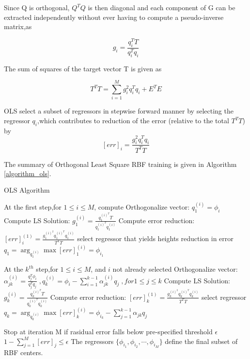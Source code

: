 \documentclass[12pt,a4paper,oneside]{article}
\numberwithin{equation}{section}
\numberwithin{algorithm}{section}
\begin{document}
	Since Q is orthogonal, $Q^TQ$ is then diagonal and each component of G can be extracted independently without ever having to compute a pseudo-inverse matrix,as
	
	\begin{equation}\label{ols_pseudo_inverse}
	g_i=\frac{q^T_iT}{q^T_iq_i}
	\end{equation}
	
	The sum of squares of the target vector T is given as
	
	\begin{equation}
	T^TT=\sum\limits_{i=1}^{M}g^2_iq^T_iq_i+E^TE
	\end{equation}
	
	OLS select a subset of regressors in stepwise forward manner by selecting the regressor $q_i$,which contributes to reduction of the error (relative to the total $T^TT$) by
	\begin{equation}\label{ols_error}
	[err]_i=\frac{g^2_iq^T_iq_i}{T^TT}
	\end{equation}
	
	The summary of Orthogonal Least Square RBF training \cite{Chen1991} is given in Algorithm \ref{algorithm_ols}.
	
	\begin{algorithm}
	\caption{OLS Algorithm}
	\label{algorithm_ols}
	\begin{algorithmic}[1]
	\STATE At the first step,for $1\le i\le M$, compute
	\STATE \qquad\qquad Orthogonalize vector: $q^{(i)}_1=\phi_i$
	\STATE \qquad\qquad Compute LS Solution:	$g^{(i)}_1=\frac{q^{{(i)}^T}_1T}{q^{{(i)}^T}_1q^{(i)}_1}$
	\STATE \qquad\qquad Compute error reduction: $[err]^{(1)}_i=\frac{g^{{(i)}^2}_1q^{{(i)}^T}_1q^{(i)}_1}{T^TT}$
	\STATE \quad select regressor that yields heights reduction in error $q_1=\arg_{q^{(i)}_1}\max[err]^{(i)}_1=\phi_{i_1}$
	
	
	\STATE At the $k^{th}$ step,for $1\le i\le M$, and $i$ not already selected
	\STATE \qquad\qquad Orthogonalize vector: $\alpha^{(i)}_{jk}=\frac{q^T_j\phi_i}{q^T_jq_j} \;, q^{(i)}_k=\phi_i-\sum\limits_{i=1}^{k-1}\alpha^{(i)}_{jk}q_j \;, for 1\le j \le k $
	\STATE \qquad\qquad Compute LS Solution:	$g^{(i)}_k=\frac{q^{{(i)}^T}_kT}{q^{{(i)}^T}_kq^{(i)}_k}$
	\STATE \qquad\qquad Compute error reduction: $[err]^{(1)}_k=\frac{g^{{(i)}^2}_kq^{{(i)}^T}_kq^{(i)}_k}{T^TT}$
	\STATE \quad select regressor $q_k=\arg_{q^{(i)}_k}\max[err]^{(i)}_k=\phi_{i_k}-\sum\limits_{j=1}^{k-1}\alpha_{jk}q_j$
	
	\STATE Stop at iteration M if rasidual error falls below pre-specified threshold $\epsilon$
	\STATE \qquad\qquad\qquad $1- \sum\limits_{j=1}^{M}[err]_j \le \epsilon $
	\STATE The regressors $\lbrace{\phi_{i_1},\phi_{i_2},\cdots,\phi_{i_M}}\rbrace$ define the final subset of RBF centers.
	\end{algorithmic}
	\end{algorithm}
	
\end{document}
